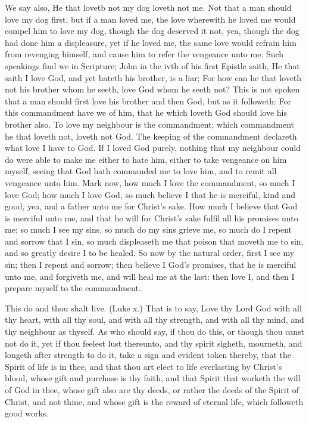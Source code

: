 We say also, He that lovetb not my dog loveth not me. 
Not that a man should love my dog first, but if a man 
loved me, the love wherewith he loved me would compel 
him to love my dog, though the dog deserved it not, yea, 
though the dog had done him a displeasure, yet if he loved 
me, the same love would refrain him from revenging himself, 
and cause him to refer the vengeance unto me. Such 
speakings find we in Scripture; John in the ivth of his 
first Epistle saith, He that saith I love God, and yet hateth 
his brother, is a liar; For how can he that loveth not his 
brother whom he seeth, love God whom he seeth not? 
This is not spoken that a man should first love his brother 
and then God, but as it followeth: For this commandment 
have we of him, that he which loveth God should love his 
brother also. To love my neighbour is the commandment; 
which commandment he that loveth not, loveth not God. 
The keeping of the commandment declareth what love I
have to God. If I loved God purely, nothing that my
neighbour could do were able to make me either to hate
him, either to take vengeance on him myself, seeing that
God hath commanded me to love him, and to remit all 
vengeance unto him. Mark now, how much I love the commandment,
so much I love God; how much I love God, 
so much believe I that he is merciful, kind and good, yea, 
and a father unto me for Christ's sake. How much I believe 
that God is merciful unto me, and that he will for 
Christ's sake fulfil all his promises unto me; so much I 
see my sins, so much do my sins grieve me, so much do 
I repent and sorrow that I sin, so much displeaseth me 
that poison that moveth me to sin, and so greatly desire I 
to be healed. So now by the natural order, first I see my 
sin; then I repent and sorrow; then believe I God's promises,
that he is merciful unto me, and forgiveth me, and 
will heal me at the last: then love I, and then I prepare 
myself to the commandment. 


This do and thou shalt live. (Luke x.) That is to say,
Love thy Lord God with all thy heart, with all thy soul, and
with all thy strength, and with all thy mind, and thy neighbour
as thyself. As who should say, if thou do this, or
though thou canst not do it, yet if thou feelest lust thereunto,
and thy spirit sigheth, mourneth, and longeth after 
strength to do it, take a sign and evident token thereby, 
that the Spirit of life is in thee, and that thou art elect to 
life everlasting by Christ's blood, whose gift and purchase 
is thy faith, and that Spirit that worketh the will of God 
in thee, whose gift also are thy deeds, or rather the deeds 
of the Spirit of Christ, and not thine, and whose gift is 
the reward of eternal life, which followeth good works. 

